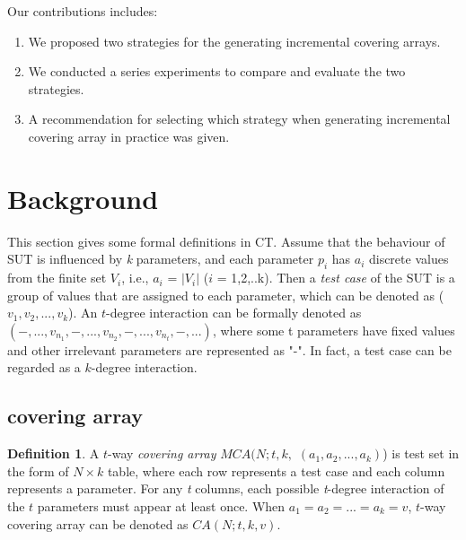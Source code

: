 \documentclass[conference]{IEEEtran}
\theoremstyle{definition}
\newtheorem{definition}{Definition}
\begin{document}
%
%
%
%
Our contributions includes:

 \begin{enumerate}
 \item  We proposed two strategies for the generating incremental covering arrays.
 \item  We conducted a series experiments to compare and evaluate the two strategies.
 \item  A recommendation for selecting which strategy when generating incremental covering array in practice was given.
\end{enumerate}
%

\section{Background}
This section gives some formal definitions in CT. Assume that the behaviour of SUT is influenced by \emph{k} parameters, and each parameter $p_{i}$ has $a_{i}$ discrete values from the finite set $V_{i}$, i.e., $a_{i}$ = $|V_{i}|$ ($i$ = 1,2,..k). Then a \emph{test case} of the SUT is a group of values that are assigned to each parameter, which can be denoted as ($v_{1}, v_{2}, ..., v_{k}$). An $t$-degree interaction can be formally denoted as $(-, ..., v_{n_{1}}, -, ..., v_{n_{2}},-, ...,v_{n_{t}}, -, ...)$, where some t parameters have fixed values and other irrelevant parameters are represented as "-". In fact, a test case can be regarded as a $k$-degree interaction.


\subsection{covering array}

\begin{definition}A $t$-way \emph{covering array} $MCA(N; t, k,$ $(a_{1}, a_{2}, ..., a_{k})$) is test set in the form of $N \times k$ table, where each row represents a test case and each column represents a parameter.  For any \emph{t} columns, each possible \emph{t}-degree interaction of the $t$ parameters must appear at least once. When $ a_{1} = a_{2} = ... = a_{k} = v $, $t$-way covering array can be denoted as $CA(N; t, k, v)$.
\end{definition}
\end{document}

